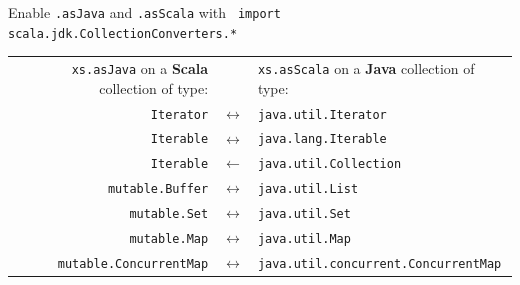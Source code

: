 \documentclass[article, a5paper]{memoir}
\newcommand{\LangColor}{scalared}
\newcommand{\head}[1]{{\bfseries {\color{\LangColor}{#1}}\par\vspace{1mm}\hrule\vspace{-2mm}}}
\newcommand{\code}{\lstinline[basicstyle=\ttfamily]}
\newcommand{\Newline}{\vspace{\baselineskip}}
\begin{document}
\Newline\vspace*{-1.5em}\head{scala.jdk.CollectionConverters}\Newline\vspace*{-0.2em}
{\small
Enable \code{.asJava} and \code{.asScala} with \code{ import scala.jdk.CollectionConverters.* }
\vspace*{0.5em}

\begin{tabular}{@{}r c l}
\texttt{xs.asJava} on a \textbf{Scala} collection of type: & & \texttt{xs.asScala} on a \textbf{Java} collection of type: \\
\texttt{Iterator} &               $\longleftrightarrow$ & \texttt{java.util.Iterator} \\
\texttt{Iterable} &               $\longleftrightarrow$ & \texttt{java.lang.Iterable} \\
\texttt{Iterable} &               $\leftarrow$ & \texttt{java.util.Collection} \\
\texttt{mutable.Buffer} &         $\longleftrightarrow$  & \texttt{java.util.List} \\
\texttt{mutable.Set} &            $\longleftrightarrow$  & \texttt{java.util.Set} \\
\texttt{mutable.Map} &            $\longleftrightarrow$  & \texttt{java.util.Map} \\
\texttt{mutable.ConcurrentMap} &  $\longleftrightarrow$  & \texttt{java.util.concurrent.ConcurrentMap} \\\end{tabular}
}
\end{document}
